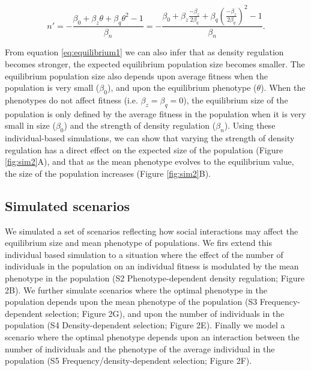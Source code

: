 \documentclass{article}
\begin{document}
\begin{equation}\label{eq:equilibrium1}
n'=-\frac{\beta_{0}+ \beta_{z}\theta + \beta_{q}\theta^2-1}{\beta_n} = -\frac{\beta_{0}+ \beta_{z}\frac{-\beta_{z}}{2\beta_{q}} + \beta_{q}(\frac{-\beta_{z}}{2\beta_{q}})^2-1}{\beta_n}. 
\end{equation}

From equation \ref{eq:equilibrium1} we can also infer that as density regulation becomes stronger, the expected equilibrium population size becomes smaller. The equilibrium population size also depends upon average fitness when the population is very small ($\beta_0$), and upon the equilibrium phenotype ($\theta$). When the phenotypes do not affect fitness (i.e. $\beta_z = \beta_q= 0$), the equilibrium size of the population is only defined by the average fitness in the population when it is very small in size ($\beta_0$) and the strength of density regulation ($\beta_n$). Using these individual-based simulations, we can show that varying the strength of density regulation has a direct effect on the expected size of the population (Figure \ref{fig:sim2}A), and that as the mean phenotype evolves to the equilibrium value, the size of the population increases (Figure \ref{fig:sim2}B).   

\subsection{Simulated scenarios}
We simulated a set of scenarios reflecting how social interactions may affect the equilibrium size and mean phenotype of populations. We firs extend this individual based simulation to a situation where the effect of the number of individuals in the population on an individual fitness is modulated by the mean phenotype in the population (S2 Phenotype-dependent density regulation; Figure 2B). We further simulate scenarios where the optimal phenotype in the population depends upon the mean phenotype of the population (S3 Frequency-dependent selection; Figure 2G), and upon the number of individuals in the population (S4 Density-dependent selection; Figure 2E). Finally we model a scenario where the optimal phenotype depends upon an interaction between the number of individuals and the phenotype of the average individual in the population (S5 Frequency/density-dependent selection; Figure 2F). 
\end{document}
